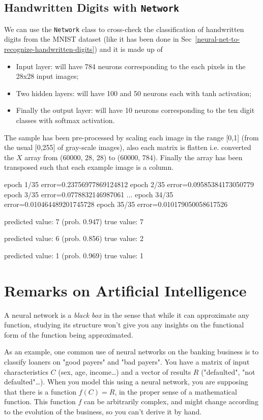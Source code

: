 \subsection{Handwritten Digits with \texttt{Network}}

We can use the \texttt{Network} class to cross-check the classification of handwritten digits from the MNIST dataset (like it has been done in Sec~\ref{neural-net-to-recognize-handwritten-digits}) and it is made up of
\begin{itemize}
\item Input layer: will have 784 neurons corresponding to the each pixels in the 28x28 input images;
\item Two hidden layers: will have 100 and 50 neurons each with tanh activation;
\item Finally the output layer: will have 10 neurons corresponding to the ten digit classes with softmax activation.
\end{itemize}

The sample has been pre-processed by scaling each image in the range [0,1] (from the usual [0,255] of gray-scale images), also each matrix is flatten i.e. converted the $X$ array from (60000, 28, 28) to (60000, 784). Finally the array has been transposed such that each example image is a column.


\begin{ioutput}
epoch 1/35  error=0.23756977869124812
epoch 2/35  error=0.09585384173050779
epoch 3/35  error=0.0778832146987061
...
epoch 34/35  error=0.010464489201745728
epoch 35/35  error=0.010179050058617526

predicted value: 7 (prob. 0.947)
true value: 7

predicted value: 6 (prob. 0.856)
true value: 2

predicted value: 1 (prob. 0.969)
true value: 1
\end{ioutput}

\section{Remarks on Artificial Intelligence}

A neural network is a \emph{black box} in the sense that while it can approximate any function, studying its structure won't give you any insights on the functional form of the function being approximated.

As an example, one common use of neural networks on the banking business is to classify loaners on "good payers" and "bad payers". You have a matrix of input characteristics $C$ (sex, age, income\ldots) and a vector of results $R$ ("defaulted", "not defaulted"\ldots). When you model this using a neural network, you are supposing that there is a function $f(C)=R$, in the proper sense of a mathematical function. This function $f$ can be arbitrarily complex, and might change according to the evolution of the business, so you can't derive it by hand.

